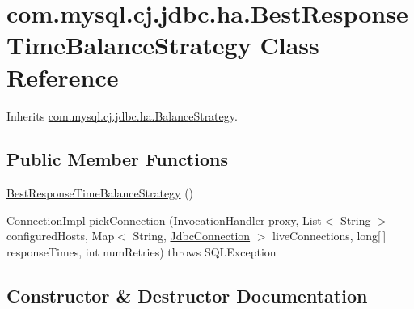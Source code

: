 \hypertarget{classcom_1_1mysql_1_1cj_1_1jdbc_1_1ha_1_1_best_response_time_balance_strategy}{}\section{com.\+mysql.\+cj.\+jdbc.\+ha.\+Best\+Response\+Time\+Balance\+Strategy Class Reference}
\label{classcom_1_1mysql_1_1cj_1_1jdbc_1_1ha_1_1_best_response_time_balance_strategy}


Inherits \mbox{\hyperlink{interfacecom_1_1mysql_1_1cj_1_1jdbc_1_1ha_1_1_balance_strategy}{com.\+mysql.\+cj.\+jdbc.\+ha.\+Balance\+Strategy}}.

\subsection*{Public Member Functions}
\begin{DoxyCompactItemize}
\item 
\mbox{\hyperlink{classcom_1_1mysql_1_1cj_1_1jdbc_1_1ha_1_1_best_response_time_balance_strategy_ae3d714368228266480cb83de581f883d}{Best\+Response\+Time\+Balance\+Strategy}} ()
\item 
\mbox{\hyperlink{classcom_1_1mysql_1_1cj_1_1jdbc_1_1_connection_impl}{Connection\+Impl}} \mbox{\hyperlink{classcom_1_1mysql_1_1cj_1_1jdbc_1_1ha_1_1_best_response_time_balance_strategy_a74a8dcc0f838d2df9ff727db02bfe628}{pick\+Connection}} (Invocation\+Handler proxy, List$<$ String $>$ configured\+Hosts, Map$<$ String, \mbox{\hyperlink{interfacecom_1_1mysql_1_1cj_1_1jdbc_1_1_jdbc_connection}{Jdbc\+Connection}} $>$ live\+Connections, long\mbox{[}$\,$\mbox{]} response\+Times, int num\+Retries)  throws S\+Q\+L\+Exception 
\end{DoxyCompactItemize}


\subsection{Constructor \& Destructor Documentation}
\mbox{\label{classcom_1_1mysql_1_1cj_1_1jdbc_1_1ha_1_1_best_response_time_balance_strategy_ae3d714368228266480cb83de581f883d}} 
